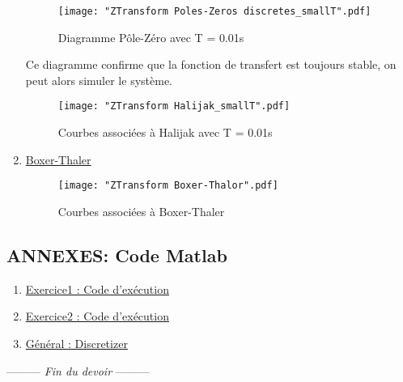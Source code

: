 \documentclass[a4paper,12pt,fleqn]{article}
\newcommand{\lastwords}{Fin du devoir}
\begin{document}
\begin{enumerate}
\begin{figure}[htb]
  \centering      
    \texttt{[image: "ZTransform Poles-Zeros discretes\_smallT".pdf]}
	\caption{Diagramme Pôle-Zéro avec T = 0.01s}
\end{figure}

Ce diagramme confirme que la fonction de transfert est toujours stable, on peut alors simuler le système.

\begin{figure}[htb]
  \centering      
    \texttt{[image: "ZTransform Halijak\_smallT".pdf]}
	\caption{Courbes associées à Halijak avec T = 0.01s}
\end{figure}
\FloatBarrier

\pagebreak[4]
\item \underline{Boxer-Thaler}

\begin{figure}[htb]
  \centering      
    \texttt{[image: "ZTransform Boxer-Thalor".pdf]}
	\caption{Courbes associées à Boxer-Thaler}
\end{figure}

\end{enumerate}

\pagebreak[4]
\begin{center}
\section*{\textbf{ANNEXES: Code Matlab}}
\end{center}

\begin{enumerate}
\item \underline{Exercice1 : Code d'exécution}



\newpage
\item \underline{Exercice2 : Code d'exécution}



\newpage
\item \underline{Général : Discretizer}



\end{enumerate}


\begin{center}
\vspace{3cm}
--------- \textit{\lastwords} ---------
\end{center}


\label{finalpage}
\end{document}
